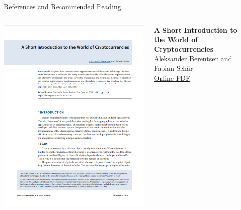 \documentclass[]{beamer}
\begin{document}
\begin{frame}{References and Recommended Reading}
\begin{columns}
	\begin{column}{0.3\textwidth}
	\center
	\includegraphics[width=\textwidth , frame]{../assets/images/short-introduction-cryptocurrencies.png} 
	\end{column}
	\begin{column}{0.7\textwidth}
	\textbf{A Short Introduction to the World of Cryptocurrencies} \\
	Aleksander Berentsen and Fabian Schär \\
	\link \href{https://files.stlouisfed.org/files/htdocs/publications/review/2018/01/10/a-short-introduction-to-the-world-of-cryptocurrencies.pdf}{Online PDF}
	\end{column}
\end{columns}
\end{frame}
\end{document}
